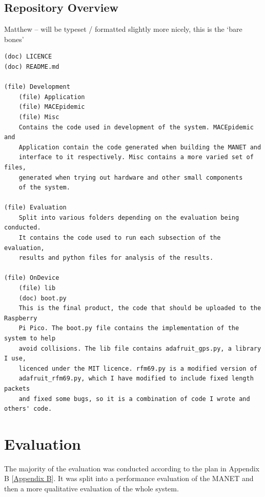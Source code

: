 \documentclass[12pt,a4paper]{report}
\newcommand{\newchapter}[2]{
    \setcounter{chapter}{#1}
    \setcounter{section}{0}
    \chapter*{#2}
    \addcontentsline{toc}{chapter}{#1 #2}
}
\begin{document}
{%


\section{Repository Overview}
Matthew -- will be typeset / formatted slightly more nicely, this is the `bare bones'
\begin{verbatim}
(doc) LICENCE
(doc) README.md

(file) Development
    (file) Application
    (file) MACEpidemic
    (file) Misc
    Contains the code used in development of the system. MACEpidemic and 
    Application contain the code generated when building the MANET and 
    interface to it respectively. Misc contains a more varied set of files, 
    generated when trying out hardware and other small components 
    of the system.  

(file) Evaluation
    Split into various folders depending on the evaluation being conducted. 
    It contains the code used to run each subsection of the evaluation, 
    results and python files for analysis of the results. 

(file) OnDevice
    (file) lib
    (doc) boot.py 
    This is the final product, the code that should be uploaded to the Raspberry 
    Pi Pico. The boot.py file contains the implementation of the system to help 
    avoid collisions. The lib file contains adafruit_gps.py, a library I use, 
    licenced under the MIT licence. rfm69.py is a modified version of 
    adafruit_rfm69.py, which I have modified to include fixed length packets 
    and fixed some bugs, so it is a combination of code I wrote and others' code. 
 \end{verbatim}

\newchapter{4}{Evaluation}
\setcounter{figure}{0}
The majority of the evaluation was conducted according to the plan in Appendix B [\hyperref[appendixB]{Appendix B}]. It was split into a performance evaluation of the MANET and then a more qualitative evaluation of the whole system.

}
\end{document}
